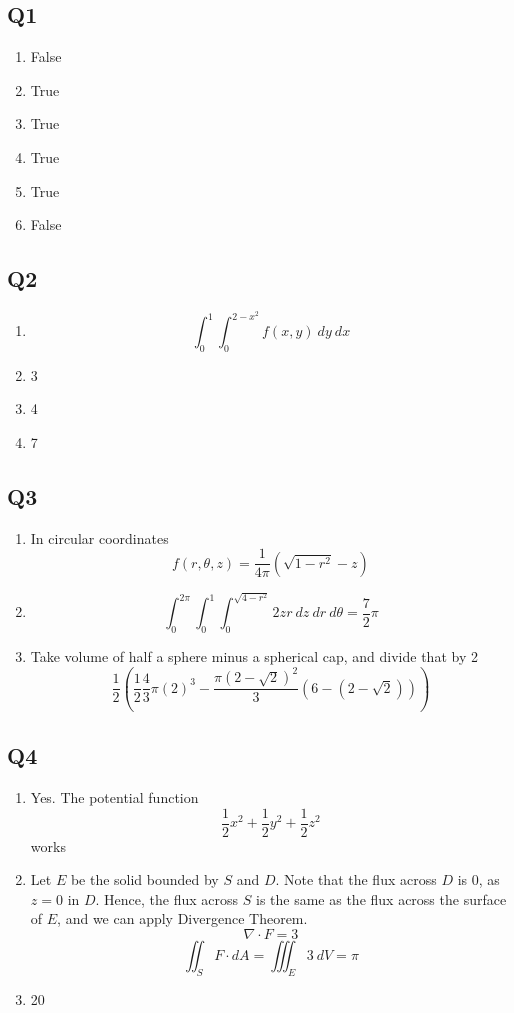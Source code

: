 \documentclass{article}
\newcommand{\paren}[1]{\left(#1\right)}
\begin{document}
\subsection*{Q1}

\begin{enumerate}[label=\alph*.]
\item False
\item True
\item True
\item True
\item True
\item False
\end{enumerate}

\subsection*{Q2}

\begin{enumerate}[label=\alph*.]
\item
\[\int_0^1 \int_0^{2-x^2} f(x,y)\ dy\ dx\]
\item 3
\item 4
\item 7
\end{enumerate}

\subsection*{Q3}

\begin{enumerate}[label=\alph*.]
\item
In circular coordinates
\[f(r,\theta,z) = \frac{1}{4\pi} (\sqrt{1-r^2} - z)\]
\item
\[\int_0^{2\pi} \int_0^1 \int_0^{\sqrt{4-r^2}} 2zr\ dz\ dr\ d\theta = \frac{7}{2}\pi\]
\item
Take volume of half a sphere minus a spherical cap, and divide that by 2
\[\frac{1}{2}\paren{\frac{1}{2}\frac{4}{3}\pi(2)^3 - \frac{\pi(2-\sqrt{2})^2}{3}(6-(2-\sqrt{2}))}\]
\end{enumerate}

\subsection*{Q4}

\begin{enumerate}[label=\alph*.]
\item Yes. The potential function
\[\frac{1}{2}x^2 + \frac{1}{2}y^2 + \frac{1}{2}z^2\]
works
\item Let $E$ be the solid bounded by $S$ and $D$. Note that the flux across $D$ is $0$, as $z=0$ in $D$. Hence, the flux across $S$ is the same as the flux across the surface of $E$, and we can apply Divergence Theorem.
\[\nabla \cdot F = 3\]
\[\iint_S F\cdot dA = \iiint_E 3\ dV = \pi\]
\item 20
\end{enumerate}
\end{document}
